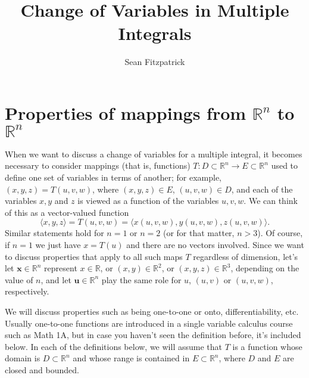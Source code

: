 \documentclass[12pt,letterpaper]{article}
\title{Change of Variables in Multiple Integrals}
\author{Sean Fitzpatrick}
\newcommand{\R}{\mathbb{R}}
\newcommand{\x}{\mathbf{x}}
\newcommand{\uu}{\mathbf{u}}
\begin{document}
\maketitle



\section{Properties of mappings from $\R^n$ to $\R^n$}
When we want to discuss a change of variables for a multiple integral, it becomes necessary to consider mappings (that is, functions) $T:D\subset \R^n\to E\subset \R^n$ used to define one set of variables in terms of another; for example, $(x,y,z) = T(u,v,w)$, where $(x,y,z)\in E$, $(u,v,w)\in D$, and each of the variables $x,y$ and $z$ is viewed as a function of the variables $u,v,w$. We can think of this as a vector-valued function
\[
\langle x,y,z\rangle = T(u,v,w) = \langle x(u,v,w),y(u,v,w),z(u,v,w)\rangle.
\]
Similar statements hold for $n=1$ or $n=2$ (or for that matter, $n>3$). Of course, if $n=1$ we just have $x=T(u)$ and there are no vectors involved. Since we want to discuss properties that apply to all such maps $T$ regardless of dimension, let's let $\x\in \R^n$ represent $x\in \R$, or $(x,y)\in \R^2$, or $(x,y,z)\in \R^3$, depending on the value of $n$, and let $\uu\in\R^n$ play the same role for $u$, $(u,v)$ or $(u,v,w)$, respectively.

We will discuss properties such as being one-to-one or onto, differentiability, etc. Usually one-to-one functions are introduced in a single variable calculus course such as Math 1A, but in case you haven't seen the definition before, it's included below. In each of the definitions below, we will assume that $T$ is a function whose domain is $D\subset \R^n$ and whose range is contained in $E\subset \R^n$, where $D$ and $E$ are closed and bounded.
\end{document}
